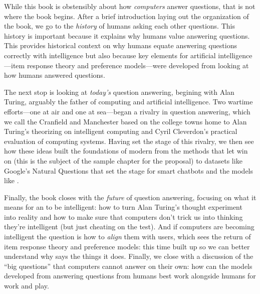 
While this book is obstensibly about how \emph{computers} answer questions,
that is not where the book begins.  After a brief introduction laying out the
organization of the book, we go to the \emph{history} of humans asking each other
questions.
%
This history is important because it explains why humans value answering
questions.
%
This provides historical context on why humans equate answering
questions correctly with intelligence but also because key elements for
artificial intelligence---item response theory and preference models---were
developed from looking at how humans answered questions.

The next stop is looking at \emph{today's} question answering, begining with
Alan Turing, arguably the father of computing and artificial intelligence.
%
Two wartime efforts---one at air and one at sea---began a rivalry in question
answering, which we call the Cranfield and Manchester based on the college
towns home to Alan Turing's theorizing on intelligent computing and Cyril
Cleverdon's practical evaluation of computing systems.
%
Having set the stage of this rivalry, we then see how these ideas built the
foundations of modern  from the methods that let \watson{} win on
\jeopardy{}
%
\ifproposal
(this is the subject of the sample chapter for the proposal)
\fi
%
to datasets like Google's Natural Questions that set the stage for
smart chatbots and the models like .

Finally, the book closes with the \emph{future} of question answering,
focusing on what it means for an  to be intelligent: how to turn Alan
Turing's thought experiment into reality and how to make sure that computers
don't trick us into thinking they're intelligent (but just cheating on the
test).
%
And if computers are becoming intelligent the question is how to \emph{align}
them with users, which sees the return of item response theory and preference
models: this time built up so we can better understand why  says the
things it does.
%
Finally, we close with a discussion of the ``big questions'' that computers
cannot answer on their own: how can the models developed from answering
questions from humans best work alongside humans for work and play.

